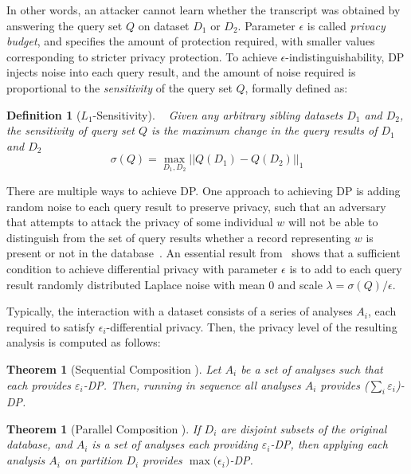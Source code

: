 \documentclass{USC-Thesis}
\numberwithin{equation}{chapter}
\begin{document}
In other words, an attacker cannot learn whether the transcript was obtained by answering the query set $Q$ on dataset $D_1$ or $D_2$. Parameter $\epsilon$ is called {\em privacy budget}, and specifies the amount of protection required, with smaller values corresponding to stricter privacy protection. To achieve $\epsilon$-indistinguishability, DP injects noise into each query result, and the amount of noise required is proportional to the {\em sensitivity} of the query set $Q$, formally defined as:

\newtheorem{sensitivity}[definition]{Definition}\label{sensitivity}
\begin{sensitivity}[$L_1$-Sensitivity]~\cite{dwork2006calibrating}
Given any arbitrary sibling datasets $D_1$ and $D_2$, the sensitivity of query set $Q$ is the maximum change in the query results of $D_1$ and $D_2$
$$\sigma(Q) = \max_{D_1, D_2}||Q(D_1)-Q(D_2)||_1$$
\end{sensitivity}
There are multiple ways to achieve DP. One approach to achieving DP is adding random noise to each query result to preserve privacy, such that an adversary that attempts to attack the privacy of some individual $w$ will not be able to distinguish from the set of query results whether a record representing $w$ is present or not in the database~\cite{dwork2006calibrating}.
An essential result from~\cite{dwork2006calibrating} shows that a sufficient condition to achieve differential privacy with parameter $\epsilon$ is to add to each query result randomly distributed Laplace noise with mean 0 and scale $\lambda = \sigma(Q)/\epsilon$.

Typically, the interaction with a dataset consists of a series of analyses $A_i$, each required to satisfy $\epsilon_i$-differential privacy. Then, the privacy level of the resulting analysis is computed as follows:

\newtheorem{sequential_composition}[theorem]{Theorem}\label{sequential_composition}
\begin{sequential_composition} [Sequential Composition \cite{mcsherry2009differentially}]
Let $A_i$ be a set of analyses such that each provides $\varepsilon_i$-DP. Then, running in sequence all analyses $A_i$ provides ($\sum_{i}\varepsilon_i$)-DP.
\end{sequential_composition}

\newtheorem{parallel_composition}[theorem]{Theorem}\label{parallel_composition}
\begin{parallel_composition} [Parallel Composition \cite{mcsherry2009differentially}]
If $D_i$ are disjoint subsets of the original database, and $A_i$ is a set of analyses each providing $\varepsilon_i$-DP, then applying each analysis $A_i$ on partition $D_i$ provides $\max{(\epsilon_i})$-DP.
\end{parallel_composition}
\end{document}
